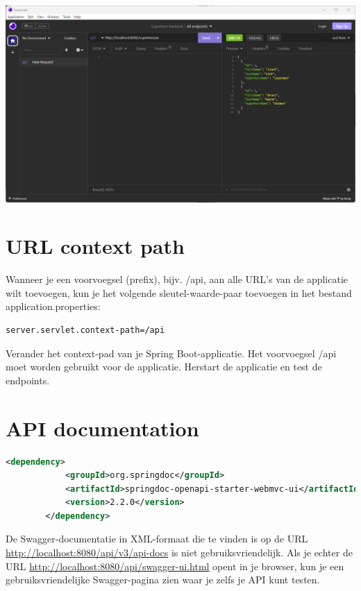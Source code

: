 \includegraphics[width=\textwidth]{./images/chapter2/get-request-insomnia.png}

\section{URL context path}

Wanneer je een voorvoegsel (prefix), bijv. /api, aan alle URL's van de applicatie wilt toevoegen, kun je het volgende sleutel-waarde-paar toevoegen in het bestand application.properties:

\begin{lstlisting}[frame=single]
server.servlet.context-path=/api
\end{lstlisting}


\begin{oefening}
Verander het context-pad van je Spring Boot-applicatie. Het voorvoegsel /api moet worden gebruikt voor de applicatie. Herstart de applicatie en test de endpoints.
\end{oefening}

\section{API documentation}



\begin{lstlisting}[language=xml]
<dependency>
			<groupId>org.springdoc</groupId>
			<artifactId>springdoc-openapi-starter-webmvc-ui</artifactId>
			<version>2.2.0</version>
		</dependency>
\end{lstlisting}

De Swagger-documentatie in XML-formaat die te vinden is op de URL \url{http://localhost:8080/api/v3/api-docs} is niet gebruiksvriendelijk. Als je echter de URL \url{http://localhost:8080/api/swagger-ui.html} opent in je browser, kun je een gebruiksvriendelijke Swagger-pagina zien waar je zelfs je API kunt testen.

